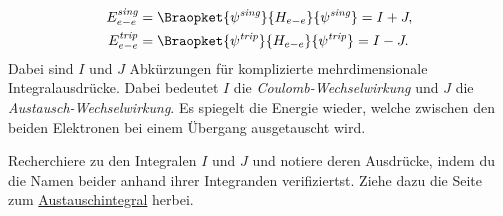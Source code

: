 \documentclass{subfiles}
\begin{document}
        \begin{align*}
            E_{e-e}^\textit{sing} &= \Braopket{\psi^\textit{sing}}{H_{e-e}}{\psi^\textit{sing}} = I + J, \\
            E_{e-e}^\textit{trip} &= \Braopket{\psi^\textit{trip}}{H_{e-e}}{\psi^\textit{trip}} = I - J.
        \end{align*} 
        Dabei sind $I$ und $J$ Abkürzungen für komplizierte mehrdimensionale Integralausdrücke. Dabei bedeutet $I$ die \emph{Coulomb-Wechselwirkung} und $J$ die \emph{Austausch-Wechselwirkung}. Es spiegelt die Energie wieder, welche zwischen den beiden Elektronen bei einem Übergang ausgetauscht wird.
        \begin{Aufgabe}
            \nr{} Recherchiere zu den Integralen $I$ und $J$ und notiere deren Ausdrücke, indem du die Namen beider anhand ihrer Integranden verifiziertst. Ziehe dazu die Seite zum \href{https://de.wikipedia.org/wiki/Austauschwechselwirkung}{Austauschintegral} herbei.
        \end{Aufgabe}
\end{document}
